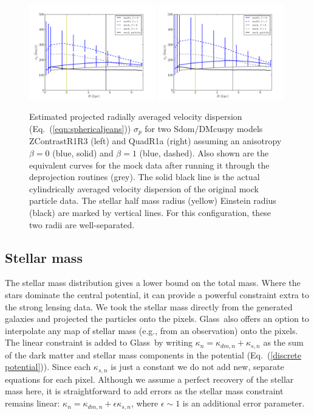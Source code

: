 \documentclass[galley,usenatbib]{mn2e}
\newcommand{\Glass}{{\sc Glass}}
\newcommand{\eqnref}[1] {Eq.~(\ref{#1})}
\begin{document}
\begin{figure}
\includegraphics[width=0.49\textwidth]{BCZContrastR1R3_TmS_sigp.pdf}
\includegraphics[width=0.49\textwidth]{BCQuadR1a_TmS_sigp.pdf}
\caption{
  Estimated projected radially averaged velocity dispersion (\eqnref{eqn:sphericaljeans}) $\sigma_p$ for two Sdom/DMcuspy models ZContrastR1R3
  (left) and QuadR1a (right) assuming an anisotropy $\beta=0$ (blue, solid) and $\beta=1$
  (blue, dashed).  Also shown are the equivalent curves for the mock data after
  running it through the deprojection routines (grey). The solid black line is
  the actual cylindrically averaged velocity dispersion of the original mock particle data.
  The stellar half mass radius (yellow) Einstein
radius (black) are marked by vertical lines. For this configuration, these two
radii are well-separated.}
  \label{fig:sigp} \end{figure}

\subsection{Stellar mass}
\label{stellar mass}

The stellar mass distribution gives a lower bound on the total mass. Where the stars dominate the central potential, it can provide a powerful constraint extra to the strong lensing data. We took the stellar mass directly from
the generated galaxies and projected the particles onto the pixels. \Glass\
also offers an option to interpolate any map of stellar mass (e.g., from an
observation) onto the pixels. The linear constraint is added to \Glass\ by
writing $\kappa_n = \kappa_{dm,n} + \kappa_{s,n}$ as the sum of the
dark matter and stellar mass components in the potential (\eqnref{discrete
potential}). Since each $\kappa_{s,n}$ is just a constant we do not add new,
separate equations for each pixel. Although we assume a perfect recovery of the stellar mass here, it is straightforward to add errors as the stellar mass constraint remains linear: $\kappa_n = \kappa_{dm,n} + \epsilon \kappa_{s,n}$, where $\epsilon \sim 1$ is an additional error parameter. 
\end{document}
